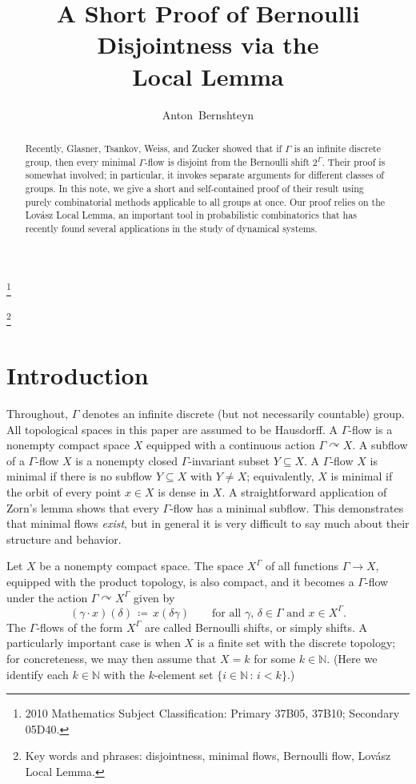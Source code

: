 \documentclass[11pt, reqno, psamsfonts]{amsart}
\title{A Short Proof of Bernoulli Disjointness via the\\ Local Lemma}
\date{}
\author{Anton~Bernshteyn}
\theoremstyle{bfnote}
\theoremstyle{claim}
\theoremstyle{definition}
\theoremstyle{remark}
\newcommand{\0}{\varnothing}
\newcommand{\set}[1]{\{#1\}}
\newcommand{\acts}{\curvearrowright}
\newcommand{\N}{{\mathbb{N}}}
\renewcommand{\G}{\Gamma}
\newcommand{\defeq}{\coloneqq}
\newcommand{\emphd}[1]{{\fontseries{b}\selectfont\textsf{#1}}}
\newcommand{\bemph}[1]{{\normalfont#1}} %
\newcommand{\ep}[1]{\bemph{(}#1\bemph{)}} %
\numberwithin{equation}{section}
\newcommand\blfootnote[1]{%
	\begingroup
	\renewcommand\thefootnote{}\footnote{#1}%
	\addtocounter{footnote}{-1}%
	\endgroup
}
\begin{document}
	
	\pagestyle{plain}
	
	\maketitle
	
	\blfootnote{2010 Mathematics Subject Classification: Primary 37B05, 37B10; Secondary 05D40.}%
	
	\blfootnote{Key words and phrases: disjointness, minimal flows, Bernoulli flow, Lov\'asz Local Lemma.}%
	
	\begin{abstract}
		Recently, Glasner, Tsankov, Weiss, and Zucker showed that if $\G$ is an infinite discrete group, then every minimal $\G$-flow is disjoint from the Bernoulli shift $2^\G$. Their proof is somewhat involved; in particular, it invokes separate arguments for different classes of groups. In this note, we give a short and self-contained proof of their result using purely combinatorial methods  applicable to all groups at once. Our proof relies on the Lov\'asz Local Lemma, an important tool in probabilistic combinatorics that has recently found several applications in the study of dynamical systems.
	\end{abstract}

	\section{Introduction}
	
	Throughout, $\G$ denotes an infinite discrete \ep{but not necessarily countable} group. All topological spaces in this paper are assumed to be Hausdorff. A \emphd{$\G$-flow} is a nonempty compact space $X$ equipped with a continuous action $\G \acts X$. A \emphd{subflow} of a $\G$-flow $X$ is a nonempty closed $\G$-invariant subset $Y \subseteq X$. A $\G$-flow $X$ is \emphd{minimal} if there is no subflow $Y \subseteq X$ with $Y \neq X$; equivalently, $X$ is minimal if the orbit of every point $x \in X$ is dense in $X$. A straightforward application of Zorn's lemma shows that every $\G$-flow has a minimal subflow. This demonstrates that minimal flows \emph{exist}, but in general it is very difficult to say much about their structure and behavior.
	
	Let $X$ be a nonempty compact space. The space $X^\G$ of all functions $\G\to X$, equipped with the product topology, is also compact, and it becomes a $\G$-flow under the action $\G \acts X^\G$ given by
	\[
		(\gamma \cdot x)(\delta) \,\defeq\, x(\delta\gamma) \qquad \text{for all $\gamma$, $\delta \in \G$ and $x \in X^\G$}.
	\]
	The $\G$-flows of the form $X^\G$ are called \emphd{Bernoulli shifts}, or simply \emphd{shifts}. A particularly important case is when $X$ is a finite set with the discrete topology; for concreteness, we may then assume that $X = k$ for some $k \in \N$. \ep{Here we identify each $k \in \N$ with the $k$-element set $\set{i \in \N \,:\, i < k}$.}
	
\end{document}
